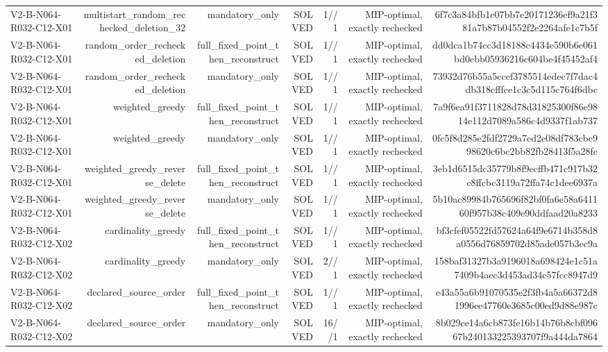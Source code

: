 {\begin{longtable}{lrrrrrr}
V2-B-N064-R032-C12-X01 & multistart\_random\_rechecked\_deletion\_32 & mandatory\_only & SOLVED & 1//1 & MIP-optimal, exactly rechecked & 6f7c3a84bfb1c07bb7e20171236ef9a21f381a7b87b04552f2e2264afe1c7b5f \\
V2-B-N064-R032-C12-X01 & random\_order\_rechecked\_deletion & full\_fixed\_point\_then\_reconstruct & SOLVED & 1//1 & MIP-optimal, exactly rechecked & dd0dca1b74cc3d18188c4434e590b6e061bd0ebb05936216c604be4f45452af4 \\
V2-B-N064-R032-C12-X01 & random\_order\_rechecked\_deletion & mandatory\_only & SOLVED & 1//1 & MIP-optimal, exactly rechecked & 73932d76b55a5ccef3785514edec7f7dac4db318cfffce1c3c5d115c764f6dbc \\
V2-B-N064-R032-C12-X01 & weighted\_greedy & full\_fixed\_point\_then\_reconstruct & SOLVED & 1//1 & MIP-optimal, exactly rechecked & 7a9f6ea91f3711828d78d31825300f86e9814e112d7089a586c4d9337f1ab737 \\
V2-B-N064-R032-C12-X01 & weighted\_greedy & mandatory\_only & SOLVED & 1//1 & MIP-optimal, exactly rechecked & 0fc5f8d285e2fdf2729a7ed2e08df783cbe998620c6bc2bb82fb28413f5a28fc \\
V2-B-N064-R032-C12-X01 & weighted\_greedy\_reverse\_delete & full\_fixed\_point\_then\_reconstruct & SOLVED & 1//1 & MIP-optimal, exactly rechecked & 3eb1d6515dc35779b8f9ecffb471c917b32c8ffcbc3119a72ffa74c1dee6937a \\
V2-B-N064-R032-C12-X01 & weighted\_greedy\_reverse\_delete & mandatory\_only & SOLVED & 1//1 & MIP-optimal, exactly rechecked & 5b10ac89984b765696f82bf0fa6e58a641160f957b38c409e90ddfaad20a8233 \\
V2-B-N064-R032-C12-X02 & cardinality\_greedy & full\_fixed\_point\_then\_reconstruct & SOLVED & 1//1 & MIP-optimal, exactly rechecked & bf3cfef05522fd57624a64f9e6714b358d8a0556d76859702d85ade057b3ec9a \\
V2-B-N064-R032-C12-X02 & cardinality\_greedy & mandatory\_only & SOLVED & 2//1 & MIP-optimal, exactly rechecked & 158baf31327b3a9196018a698424e1c51a7409b4aec3d453ad34c57fcc8947d9 \\
V2-B-N064-R032-C12-X02 & declared\_source\_order & full\_fixed\_point\_then\_reconstruct & SOLVED & 1//1 & MIP-optimal, exactly rechecked & e43a55a6b91070535e2f3fb4a5a66372d81996ee47760e3685c00ed9d88e987c \\
V2-B-N064-R032-C12-X02 & declared\_source\_order & mandatory\_only & SOLVED & 16//1 & MIP-optimal, exactly rechecked & 8b029ce14a6cb873fe16b14b76b8cbf09667b240133225393707f9a444da7864 \\

\end{longtable}}
